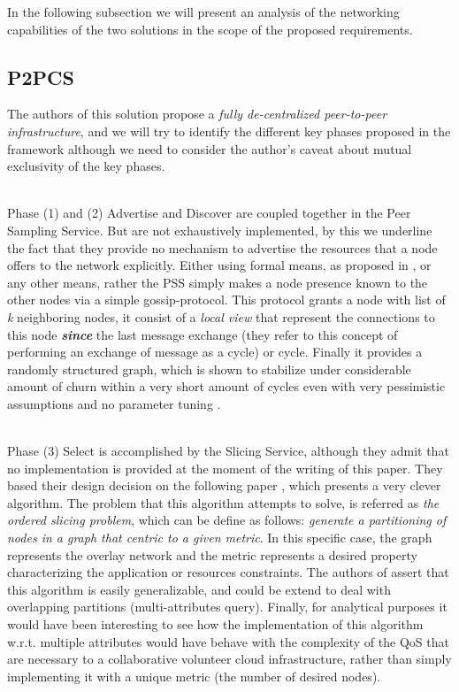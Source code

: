 \documentclass[11pt]{amsart}
\begin{document}
        In the following subsection we will present an analysis of the networking
        capabilities of the two solutions in the scope of the proposed requirements.
	
        \subsection{P2PCS}
        The authors of this solution propose a \emph{fully de-centralized peer-to-peer
          infrastructure}, and we will try to identify the different key phases proposed
        in the framework although we need to consider the author's caveat about mutual
        exclusivity of the key phases.  
        
        \\ Phase (1) and (2) {Advertise and Discover} are coupled together in the Peer
        Sampling Service. But are not exhaustively implemented, by this we underline the
        fact that they provide no mechanism to advertise the resources that a node offers
        to the network explicitly. Either using formal means, as proposed in
        \cite{p2p_collab}, or any other means, rather the PSS simply makes a node presence
        known to the other nodes via a simple gossip-protocol. This protocol grants a node
        with list of \emph{k} neighboring nodes, it consist of a \emph{local view} that
        represent the connections to this node \emph{\textbf{since}} the last message
        exchange (they refer to this concept of performing an exchange of message as a
        cycle) or cycle. Finally it provides a randomly structured graph, which is shown
        to stabilize under considerable amount of churn within a very short amount of
        cycles even with very pessimistic assumptions and no parameter
        tuning \cite{pss}.

        \\ Phase (3) {Select} is accomplished by the Slicing Service, although they admit
        that no implementation is provided at the moment of the writing of this
        paper. They based their design decision on the following paper
        \cite{jelasity2006ordered}, which presents a very clever algorithm. The problem
        that this algorithm attempts to solve, is referred as \emph{the ordered slicing
          problem}, which can be define as follows: \emph{generate a partitioning of nodes
        in a graph that centric to a given metric}. In this specific case, the graph
        represents the overlay network and the metric represents a desired property
        characterizing the application or resources constraints. The authors of
        \cite{jelasity2006ordered} assert that this algorithm is easily generalizable, and
        could be extend to deal with overlapping partitions (multi-attributes
        query). Finally, for analytical purposes it would have been interesting to see how
        the implementation of this algorithm w.r.t. multiple attributes would have behave
        with the complexity of the QoS that are necessary to a collaborative volunteer
        cloud infrastructure, rather than simply implementing it with a unique metric (the
        number of desired nodes). 
\end{document}
